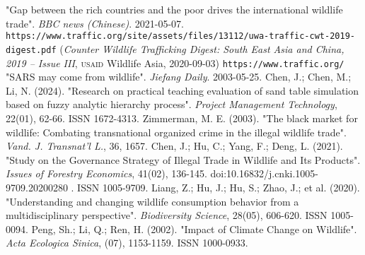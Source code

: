 \documentclass[12pt]{article}
\newcommand{\hiddensection}[1]{
\stepcounter{section}
\section*{\Roman {section} \hspace{1em}{#1}}}
\begin{document}
\begin{thebibliography}{99}
	 "Gap between the rich countries and the poor drives the international wildlife trade". \textit{BBC news (Chinese)}. 2021-05-07.
	 \texttt{https://www.traffic.org/site/assets/files/13112/uwa-traffic-cwt-2019-digest.pdf} (\textit{Counter Wildlife Trafficking Digest: South East Asia and China, 2019 -- Issue III}, \textsc{usaid} Wildlife Asia, 2020-09-03)
	 \texttt{https://www.traffic.org/}
	 "SARS may come from wildlife". \textit{Jiefang Daily}. 2003-05-25.
	 Chen, J.; Chen, M.; Li, N. (2024). "Research on practical teaching evaluation of sand table simulation based on fuzzy analytic hierarchy process". \textit{Project Management Technology}, 22(01), 62-66. ISSN 1672-4313.
	 Zimmerman, M. E. (2003). "The black market for wildlife: Combating transnational organized crime in the illegal wildlife trade". \textit{Vand. J. Transnat'l L.}, 36, 1657.
	 Chen, J.; Hu, C.; Yang, F.; Deng, L. (2021). "Study on the Governance Strategy of Illegal Trade in Wildlife and Its Products". \textit{Issues of Forestry Economics}, 41(02), 136-145. doi:10.16832/j.cnki.1005-9709.20200280 . ISSN 1005-9709.
	 Liang, Z.; Hu, J.; Hu, S.; Zhao, J.; et al. (2020). "Understanding and changing wildlife consumption behavior from a multidisciplinary perspective". \textit{Biodiversity Science}, 28(05), 606-620. ISSN 1005-0094.
	 Peng, Sh.; Li, Q.; Ren, H. (2002). "Impact of Climate Change on Wildlife". \textit{Acta Ecologica Sinica}, (07), 1153-1159. ISSN 1000-0933.
\end{thebibliography}
\clearpage
{}
\appendix
\hiddensection {Codes for Heat Map Indicating Illegal Wildlife Deals Worldwide (Key Part)}
\end{document}
